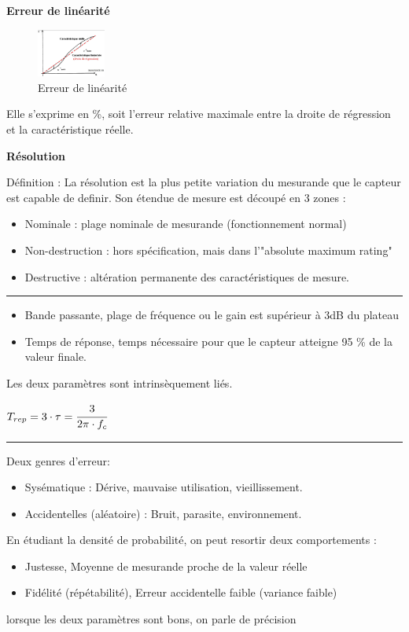 \documentclass[	DIV=calc,%
							paper=a4,%
							fontsize=11pt,%
							twocolumn]{scrartcl} %
\newcommand{\hformbar}[1]{\bigskip\hrule\vspace{5pt}} %
\newcounter{mycounter}
\newcommand{\formdesc}[1]{\noindent\textbf{#1} \addtocounter{mycounter}{1} \hfill \themycounter}
\begin{document}
\formdesc{Erreur de linéarité}
\begin{figure}[H]
    \begin{center}
        \includegraphics[width=0.2\textwidth]{img/linearite.JPG}
        \caption{Erreur de linéarité}
        \label{fig:Erreur de linéarité}
    \end{center}
\end{figure}
Elle s'exprime en \%, soit l'erreur relative maximale entre la droite de régression et la caractéristique réelle.

\formdesc{Résolution}

Définition : La résolution est la plus petite variation du mesurande que le capteur est capable de definir.
Son étendue de mesure est découpé en 3 zones : 
\begin{itemize}
    \item Nominale : plage nominale de mesurande (fonctionnement normal)
    \item Non-destruction : hors spécification, mais dans l'"absolute maximum rating"
    \item Destructive : altération permanente des caractéristiques de mesure.
\end{itemize}

\hformbar

\formdesc{Rapidité d'un capteur}

\begin{itemize}
    \item Bande passante, plage de fréquence ou le gain est supérieur à 3dB du plateau
    \item Temps de réponse, temps nécessaire pour que le capteur atteigne 95 \% de la valeur finale.
\end{itemize}
Les deux paramètres sont intrinsèquement liés. 

{\hfill $T_{rep} = 3 \cdot \tau = \cfrac{3}{2\pi \cdot f_c}$ \hfill}

\hformbar

\formdesc{Erreur de mesure}

Deux genres d'erreur:
\begin{itemize}
    \item Sysématique : Dérive, mauvaise utilisation, vieillissement.
    \item Accidentelles (aléatoire) : Bruit, parasite, environnement.
\end{itemize}
En étudiant la densité de probabilité, on peut resortir deux comportements : 
\begin{itemize}
    \item Justesse, Moyenne de mesurande proche de la valeur réelle
    \item Fidélité (répétabilité), Erreur accidentelle faible (variance faible)
\end{itemize}
lorsque les deux paramètres sont bons, on parle de précision
\end{document}
